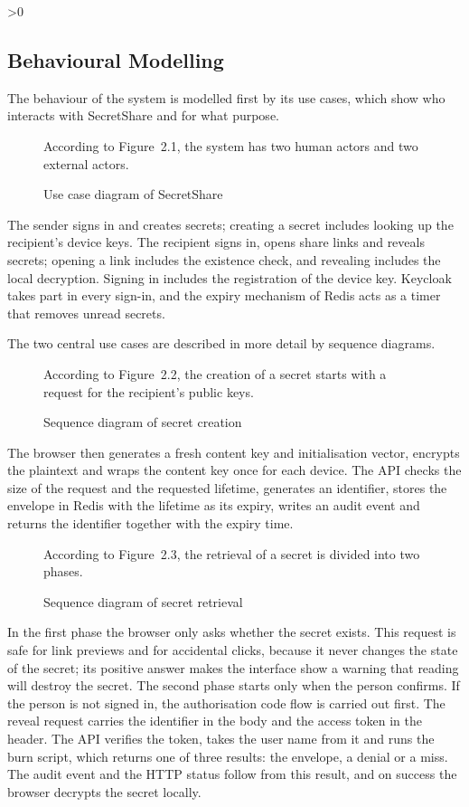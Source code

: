 \documentclass[12pt,a4paper]{article}
\numberwithin{equation}{section}
\numberwithin{figure}{section}
\numberwithin{table}{section}
\newcommand{\subsec}[1]{%
  \ifnum\value{subsection}>0\clearpage\fi
  \subsection{#1}%
}
\newcommand{\leadin}[1]{%
  {\onehalfspacing\setlength{\parindent}{1.25cm}\indent #1\par}\vspace{8pt}}
\newcommand{\diagram}[4]{%
  \begin{figure}[H]
    \leadin{#4}
    \centering
    \adjustbox{max width=\textwidth}{}
    \caption{#2}
    \label{#3}
  \end{figure}}
\begin{document}
\subsec{Behavioural Modelling}

The behaviour of the system is modelled first by its use cases, which show who interacts with SecretShare and for what purpose.

\diagram{usecase}{Use case diagram of SecretShare}{fig:usecase}{According to Figure~2.1, the system has two human actors and two external actors.}

The sender signs in and creates secrets; creating a secret includes looking up the recipient's device keys. The recipient signs in, opens share links and reveals secrets; opening a link includes the existence check, and revealing includes the local decryption. Signing in includes the registration of the device key. Keycloak takes part in every sign-in, and the expiry mechanism of Redis acts as a timer that removes unread secrets.

The two central use cases are described in more detail by sequence diagrams.

\diagram{seq_create}{Sequence diagram of secret creation}{fig:seqcreate}{According to Figure~2.2, the creation of a secret starts with a request for the recipient's public keys.}

The browser then generates a fresh content key and initialisation vector, encrypts the plaintext and wraps the content key once for each device. The API checks the size of the request and the requested lifetime, generates an identifier, stores the envelope in Redis with the lifetime as its expiry, writes an audit event and returns the identifier together with the expiry time.

\diagram{seq_reveal}{Sequence diagram of secret retrieval}{fig:seqreveal}{According to Figure~2.3, the retrieval of a secret is divided into two phases.}

In the first phase the browser only asks whether the secret exists. This request is safe for link previews and for accidental clicks, because it never changes the state of the secret; its positive answer makes the interface show a warning that reading will destroy the secret. The second phase starts only when the person confirms. If the person is not signed in, the authorisation code flow is carried out first. The reveal request carries the identifier in the body and the access token in the header. The API verifies the token, takes the user name from it and runs the burn script, which returns one of three results: the envelope, a denial or a miss. The audit event and the HTTP status follow from this result, and on success the browser decrypts the secret locally.
\end{document}
